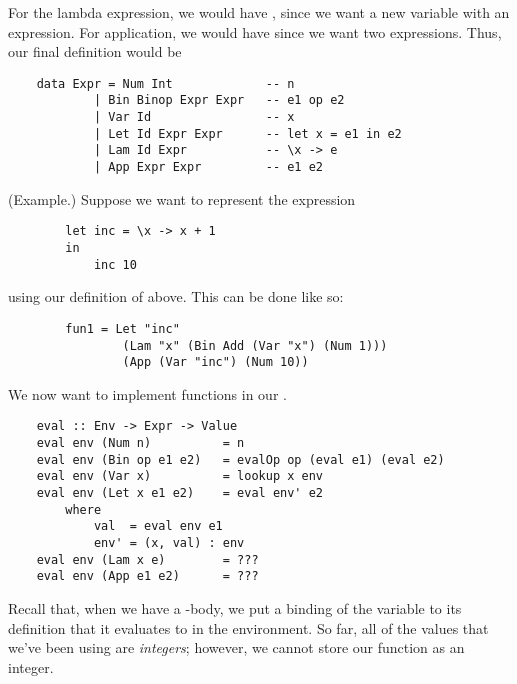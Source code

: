 \documentclass[letterpaper]{article}
\begin{document}
For the lambda expression, we would have , since we want a new variable with an expression. For application, we would have  since we want two expressions. Thus, our final definition would be 
\begin{verbatim}
    data Expr = Num Int             -- n
            | Bin Binop Expr Expr   -- e1 op e2 
            | Var Id                -- x
            | Let Id Expr Expr      -- let x = e1 in e2 
            | Lam Id Expr           -- \x -> e 
            | App Expr Expr         -- e1 e2\end{verbatim}

\begin{mdframed}[]
    (Example.) Suppose we want to represent the expression 
    \begin{verbatim}
        let inc = \x -> x + 1 
        in 
            inc 10 \end{verbatim}
    using our definition of  above. This can be done like so: 
    \begin{verbatim}
        fun1 = Let "inc"
                (Lam "x" (Bin Add (Var "x") (Num 1)))
                (App (Var "inc") (Num 10))\end{verbatim}
\end{mdframed}

We now want to implement functions in our .
\begin{verbatim}
    eval :: Env -> Expr -> Value
    eval env (Num n)          = n
    eval env (Bin op e1 e2)   = evalOp op (eval e1) (eval e2)
    eval env (Var x)          = lookup x env
    eval env (Let x e1 e2)    = eval env' e2
        where
            val  = eval env e1
            env' = (x, val) : env
    eval env (Lam x e)        = ??? 
    eval env (App e1 e2)      = ???\end{verbatim}
Recall that, when we have a -body, we put a binding of the variable to its definition that it evaluates to in the environment. So far, all of the values that we've been using are \emph{integers}; however, we cannot store our function as an integer. 
\end{document}
